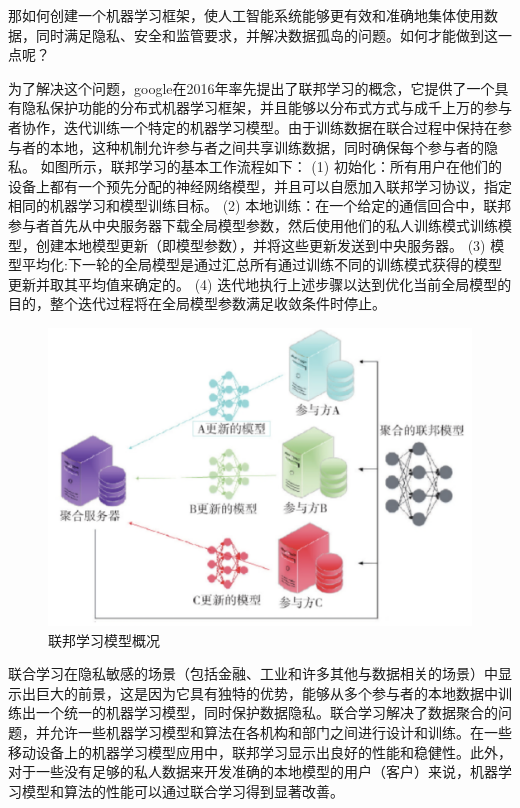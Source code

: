 那如何创建一个机器学习框架，使人工智能系统能够更有效和准确地集体使用数据，同时满足隐私、安全和监管要求，并解决数据孤岛的问题。如何才能做到这一点呢？

为了解决这个问题，google在2016年率先提出了联邦学习的概念，它提供了一个具有隐私保护功能的分布式机器学习框架，并且能够以分布式方式与成千上万的参与者协作，迭代训练一个特定的机器学习模型。由于训练数据在联合过程中保持在参与者的本地，这种机制允许参与者之间共享训练数据，同时确保每个参与者的隐私。
如图所示，联邦学习的基本工作流程如下：
(1) 初始化：所有用户在他们的设备上都有一个预先分配的神经网络模型，并且可以自愿加入联邦学习协议，指定相同的机器学习和模型训练目标。
(2) 本地训练：在一个给定的通信回合中，联邦参与者首先从中央服务器下载全局模型参数，然后使用他们的私人训练模式训练模型，创建本地模型更新（即模型参数），并将这些更新发送到中央服务器。
(3) 模型平均化:下一轮的全局模型是通过汇总所有通过训练不同的训练模式获得的模型更新并取其平均值来确定的。
(4) 迭代地执行上述步骤以达到优化当前全局模型的目的，整个迭代过程将在全局模型参数满足收敛条件时停止。

\begin{figure}[!hbt]
\centering
	\includegraphics[scale=0.5]{fig2/C1/联邦学习概况}%
	\caption{联邦学习模型概况}
	\label{fig:联邦学习模型概况}	
\end{figure}

联合学习在隐私敏感的场景（包括金融、工业和许多其他与数据相关的场景）中显示出巨大的前景，这是因为它具有独特的优势，能够从多个参与者的本地数据中训练出一个统一的机器学习模型，同时保护数据隐私。联合学习解决了数据聚合的问题，并允许一些机器学习模型和算法在各机构和部门之间进行设计和训练。在一些移动设备上的机器学习模型应用中，联邦学习显示出良好的性能和稳健性。此外，对于一些没有足够的私人数据来开发准确的本地模型的用户（客户）来说，机器学习模型和算法的性能可以通过联合学习得到显著改善。

